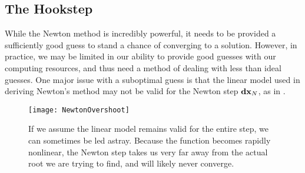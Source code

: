  \subsection{The Hookstep}
 
 While the Newton method is incredibly powerful, it needs to be provided a sufficiently good guess to stand a chance of converging to a solution. However, in practice, we may be limited in our ability to provide good guesses with our computing resources, and thus need a method of dealing with less than ideal guesses. One major issue with a suboptimal guess is that the linear model used in deriving Newton's method may not be valid for the Newton step $\mathbf{dx}_N$, as in . 
  \begin{figure}[h]
 \texttt{[image: NewtonOvershoot]}
 \caption{If we assume the linear model remains valid for the entire step, we can sometimes be led astray. Because the function becomes rapidly nonlinear, the Newton step takes us very far away from the actual root we are trying to find, and will likely never converge.}\label{fig:NewtonOvershoot}
 \end{figure}
 
